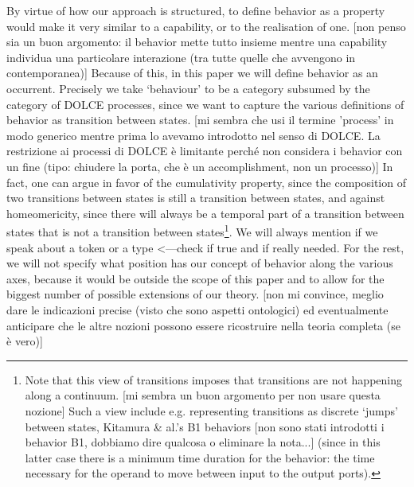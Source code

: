 \documentclass[sw]{iosart2x}
\newcommand{\DOLCE}{\textsc{DOLCE}\xspace} %
\newcommand{\TODO}[1]{{\color{red} #1}}
\begin{document}
{By virtue of how our approach is structured, to define behavior as a property would make it very similar to a capability, or to the realisation of one.\TODO{[non penso sia un buon argomento: il behavior mette tutto insieme mentre una capability individua una particolare interazione (tra tutte quelle che avvengono in contemporanea)]}  
Because of this, in this paper we will define behavior as an occurrent. 
Precisely we take `behaviour' to be a category subsumed by the category of \DOLCE processes, since we want to capture the various definitions of behavior as transition between states.\TODO{[mi sembra che usi il termine 'process' in modo generico mentre prima lo avevamo introdotto nel senso di \DOLCE. La restrizione ai processi di \DOLCE è limitante perché non considera i behavior con un fine (tipo: chiudere la porta, che è un accomplishment, non un processo)]}
In fact, one can argue in favor of the cumulativity property, since the composition of two transitions between states is still a transition between states, and against homeomericity, since there will always be a temporal part of a transition between states that is not a transition between states\footnote{Note that this view of transitions imposes that transitions are not happening along a continuum.\TODO{[mi sembra un buon argomento per non usare questa nozione]} Such a view include e.g. representing transitions as discrete `jumps' between states, Kitamura \& al.'s B1 behaviors\TODO{[non sono stati introdotti i behavior B1, dobbiamo dire qualcosa o eliminare la nota...]} (since in this latter case there is a minimum time duration for the behavior: the time necessary for the operand to move between input to the output ports).}}.  
We will always mention if we speak about a token or a type \TODO{<---check if true and if really needed}.
For the rest, we will not specify what position has our concept of behavior along the various axes, because it would be outside the scope of this paper and to allow for the biggest number of possible extensions of our theory.\TODO{[non mi convince, meglio dare le indicazioni precise (visto che sono aspetti ontologici) ed eventualmente anticipare che le altre nozioni possono essere ricostruire nella teoria completa (se è vero)]} 
\end{document}
